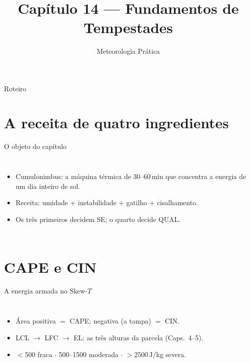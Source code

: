 \documentclass[aspectratio=169,11pt]{beamer}
\title[Cap. 14 --- Tempestades]{Capítulo 14 --- Fundamentos de
Tempestades}
\subtitle{Meteorologia Prática}
\author{}
\date{}
\begin{document}
\begin{frame}
  \titlepage
  \vfill
  \atribuicao
\end{frame}

\begin{frame}{Roteiro}
  \tableofcontents
\end{frame}

\section{A receita de quatro ingredientes}

\begin{frame}{O objeto do capítulo}
  \begin{columns}
    \begin{itemize}
      \item Cumulonimbus: a máquina térmica de 30--60\,min que
            concentra a energia de um dia inteiro de sol.
      \item Receita: \alert{umidade $+$ instabilidade $+$ gatilho $+$
            cisalhamento}.
      \item Os três primeiros decidem SE; o quarto decide QUAL.
    \end{itemize}
  \end{columns}
\end{frame}

\section{CAPE e CIN}

\begin{frame}{A energia armada no Skew-$T$}
  \begin{columns}
    \vspace{0.4em}
    \begin{itemize}
      \item Área positiva $=$ CAPE; negativa (a tampa) $=$ CIN.
      \item LCL $\to$ LFC $\to$ EL: as três alturas da parcela
            (Caps.~4--5).
      \item $<$500 fraca $\cdot$ 500--1500 moderada $\cdot$
            $>$2500\,J/kg severa.
    \end{itemize}
  \end{columns}
\end{frame}
\end{document}
